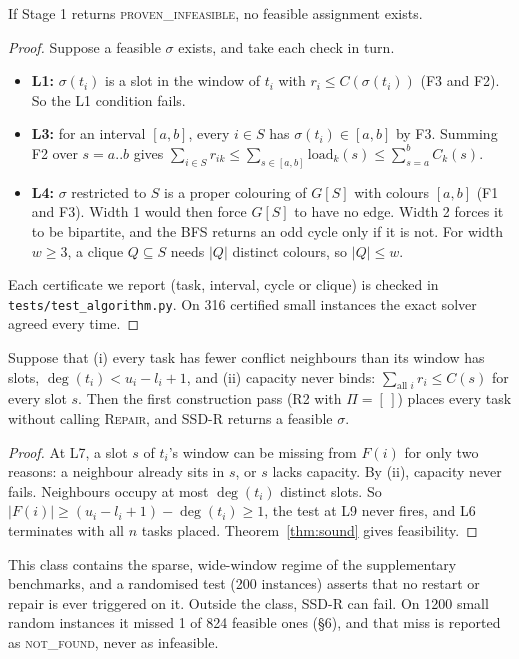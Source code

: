 \begin{lemma}[Certificates]\label{lem:cert}
If Stage 1 returns \textsc{proven\_infeasible}, no feasible assignment exists.
\end{lemma}
\begin{proof}
Suppose a feasible $\sigma$ exists, and take each check in turn.
\begin{itemize}
\item \textbf{L1:} $\sigma(t_i)$ is a slot in the window of $t_i$ with
  $r_i\le C(\sigma(t_i))$ (F3 and F2). So the L1 condition fails.
\item \textbf{L3:} for an interval $[a,b]$, every $i\in S$ has
  $\sigma(t_i)\in[a,b]$ by F3. Summing F2 over $s=a..b$ gives
  $\sum_{i\in S}r_{ik}\le\sum_{s\in[a,b]}\text{load}_k(s)\le\sum_{s=a}^b C_k(s)$.
\item \textbf{L4:} $\sigma$ restricted to $S$ is a proper colouring of
  $G[S]$ with colours $[a,b]$ (F1 and F3). Width 1 would then force $G[S]$
  to have no edge. Width 2 forces it to be bipartite, and the BFS returns an
  odd cycle only if it is not. For width $w\ge3$, a clique $Q\subseteq S$
  needs $|Q|$ distinct colours, so $|Q|\le w$.
\end{itemize}
Each certificate we report (task, interval, cycle or clique) is checked in
\texttt{tests/test\_algorithm.py}. On 316 certified small instances the
exact solver agreed every time.
\end{proof}

\begin{theorem}\label{thm:complete}
Suppose that (i) every task has fewer conflict neighbours than its window
has slots, $\deg(t_i) < u_i-l_i+1$, and (ii) capacity never binds:
$\sum_{\text{all }i} r_i \le C(s)$ for every slot $s$. Then the first
construction pass (R2 with $\Pi=[\,]$) places every task without calling
\textsc{Repair}, and SSD-R returns a feasible $\sigma$.
\end{theorem}
\begin{proof}
At L7, a slot $s$ of $t_i$'s window can be missing from $F(i)$ for only two
reasons: a neighbour already sits in $s$, or $s$ lacks capacity. By (ii),
capacity never fails. Neighbours occupy at most $\deg(t_i)$ distinct slots.
So $|F(i)|\ge(u_i-l_i+1)-\deg(t_i)\ge1$, the test at L9 never fires, and
L6 terminates with all $n$ tasks placed. Theorem~\ref{thm:sound} gives
feasibility.
\end{proof}
This class contains the sparse, wide-window regime of the supplementary
benchmarks, and a randomised test (200 instances) asserts that no restart
or repair is ever triggered on it. Outside the class, SSD-R can fail. On
1200 small random instances it missed 1 of 824 feasible ones (\S6), and
that miss is reported as \textsc{not\_found}, never as infeasible.

